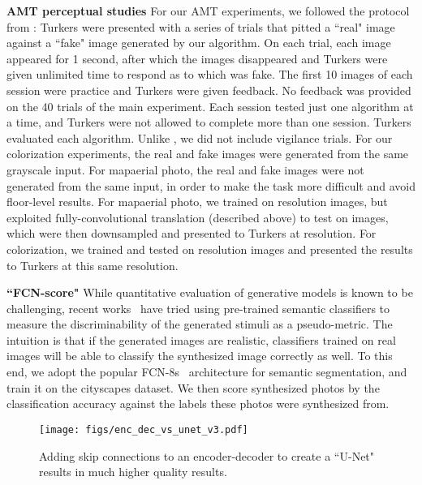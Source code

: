 \documentclass[10pt,twocolumn,letterpaper]{article}
\begin{document}
{\bf AMT perceptual studies} For our AMT experiments, we followed the protocol from \cite{zhang2016colorful}: Turkers were presented with a series of trials that pitted a ``real" image against a ``fake" image generated by our algorithm. On each trial, each image appeared for 1 second, after which the images disappeared and Turkers were given unlimited time to respond as to which was fake. The first 10 images of each session were practice and Turkers were given feedback. No feedback was provided on the 40 trials of the main experiment. Each session tested just one algorithm at a time, and Turkers were not allowed to complete more than one session.  Turkers evaluated each algorithm. Unlike \cite{zhang2016colorful}, we did not include vigilance trials. For our colorization experiments, the real and fake images were generated from the same grayscale input. For mapaerial photo, the real and fake images were not generated from the same input, in order to make the task more difficult and avoid floor-level results. For mapaerial photo, we trained on  resolution images, but exploited fully-convolutional translation (described above) to test on  images, which were then downsampled and presented to Turkers at  resolution. For colorization, we trained and tested on  resolution images and presented the results to Turkers at this same resolution.

{\bf ``FCN-score"} While quantitative evaluation of generative models is known to be challenging, recent works~\cite{salimans2016improved, wang2016generative, zhang2016colorful,owens2016visually} have tried using pre-trained semantic classifiers to measure the discriminability of the generated stimuli as a pseudo-metric. The intuition is that if the generated images are realistic, classifiers trained on real images will be able to classify the synthesized image correctly as well. To this end, we adopt the popular FCN-8s~\cite{long2015fully} architecture for semantic segmentation, and train it on the cityscapes dataset. We then score synthesized photos by the classification accuracy against the labels these photos were synthesized from.





\begin{figure}
 \centering
 \texttt{[image: figs/enc\_dec\_vs\_unet\_v3.pdf]}
 \vspace{-0.2in}
  \caption{Adding skip connections to an encoder-decoder to create a ``U-Net" results in much higher quality results.}\label{enc_dec_vs_unet}
 \vspace{-0.2in}
\end{figure}
\end{document}
